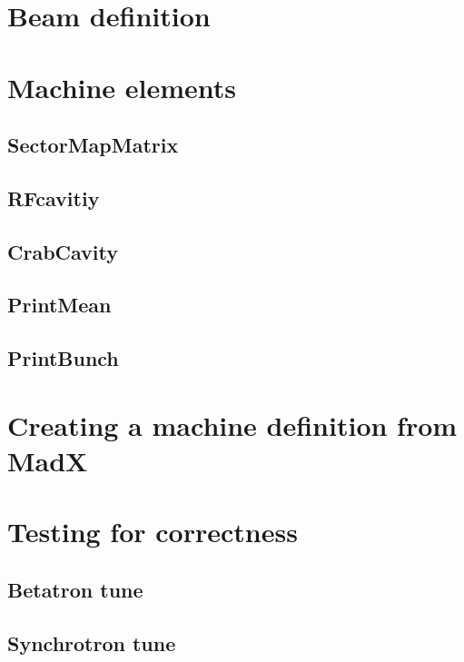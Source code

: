 \documentclass[a4paper]{report}
\begin{document}
\chapter{Beam definition}


\chapter{Machine elements}
\section{SectorMapMatrix}
\section{RFcavitiy}
\section{CrabCavity}
\section{PrintMean}
\section{PrintBunch}

\appendix
\chapter{Creating a machine definition from MadX}

\chapter{Testing for correctness}
\section{Betatron tune}

\section{Synchrotron tune}
\end{document}
